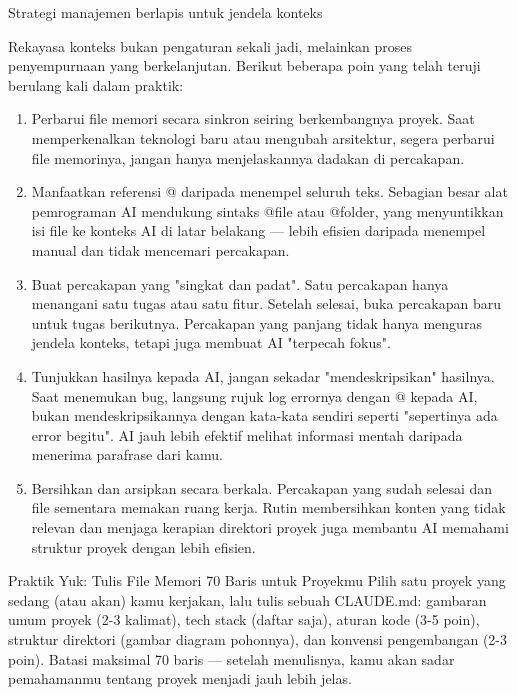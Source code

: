 \begin{center}\small\color{gray}Strategi manajemen berlapis untuk jendela konteks\end{center}


Rekayasa konteks bukan pengaturan sekali jadi, melainkan proses penyempurnaan yang berkelanjutan. Berikut beberapa poin yang telah teruji berulang kali dalam praktik:

\begin{enumerate}
  \item Perbarui file memori secara sinkron seiring berkembangnya proyek. Saat memperkenalkan teknologi baru atau mengubah arsitektur, segera perbarui file memorinya, jangan hanya menjelaskannya dadakan di percakapan.
  \item Manfaatkan referensi @ daripada menempel seluruh teks. Sebagian besar alat pemrograman AI mendukung sintaks @file atau @folder, yang menyuntikkan isi file ke konteks AI di latar belakang — lebih efisien daripada menempel manual dan tidak mencemari percakapan.
  \item Buat percakapan yang "singkat dan padat". Satu percakapan hanya menangani satu tugas atau satu fitur. Setelah selesai, buka percakapan baru untuk tugas berikutnya. Percakapan yang panjang tidak hanya menguras jendela konteks, tetapi juga membuat AI "terpecah fokus".
  \item Tunjukkan hasilnya kepada AI, jangan sekadar "mendeskripsikan" hasilnya. Saat menemukan bug, langsung rujuk log errornya dengan @ kepada AI, bukan mendeskripsikannya dengan kata-kata sendiri seperti "sepertinya ada error begitu". AI jauh lebih efektif melihat informasi mentah daripada menerima parafrase dari kamu.
  \item Bersihkan dan arsipkan secara berkala. Percakapan yang sudah selesai dan file sementara memakan ruang kerja. Rutin membersihkan konten yang tidak relevan dan menjaga kerapian direktori proyek juga membantu AI memahami struktur proyek dengan lebih efisien.
\end{enumerate}

\begin{tcbpractice}{Praktik Yuk: Tulis File Memori 70 Baris untuk Proyekmu}
Pilih satu proyek yang sedang (atau akan) kamu kerjakan, lalu tulis sebuah CLAUDE.md: gambaran umum proyek (2-3 kalimat), tech stack (daftar saja), aturan kode (3-5 poin), struktur direktori (gambar diagram pohonnya), dan konvensi pengembangan (2-3 poin). Batasi maksimal 70 baris — setelah menulisnya, kamu akan sadar pemahamanmu tentang proyek menjadi jauh lebih jelas.

\end{tcbpractice}

